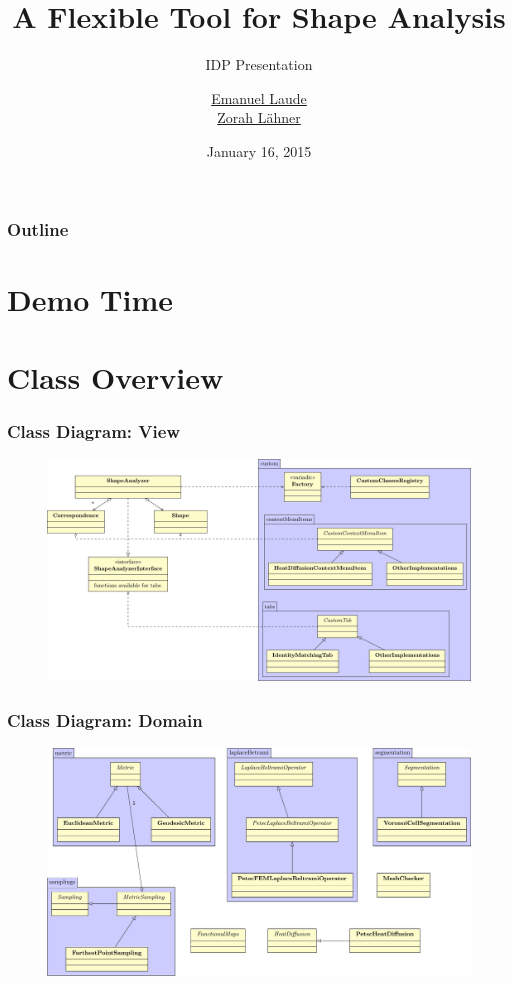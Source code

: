 \documentclass[compress]{beamer}
\title{A Flexible Tool for Shape Analysis}
\subtitle{IDP Presentation}
\author{\href{emanuel.laude@in.tum.de}{Emanuel Laude}\\ \href{laehner@in.tum.de}{Zorah L\"ahner} }
\date{January 16, 2015}
\institute{Technische Universit\"at M\"unchen}
\begin{document}
\begin{frame}
\titlepage
\end{frame}

\begin{frame}
\frametitle{Outline}
\tableofcontents
\end{frame}

\section{Demo Time}

\section{Class Overview}

\begin{frame}
\frametitle{Class Diagram: View}
\begin{figure}[h]
\centering
\includegraphics[width=\textwidth]{diagram.pdf}
\end{figure}
\end{frame}

\begin{frame}
\frametitle{Class Diagram: Domain}
\begin{figure}[h]
\centering
\includegraphics[width=\textwidth]{diagram2.pdf}
\end{figure}
\end{frame}
\end{document}
